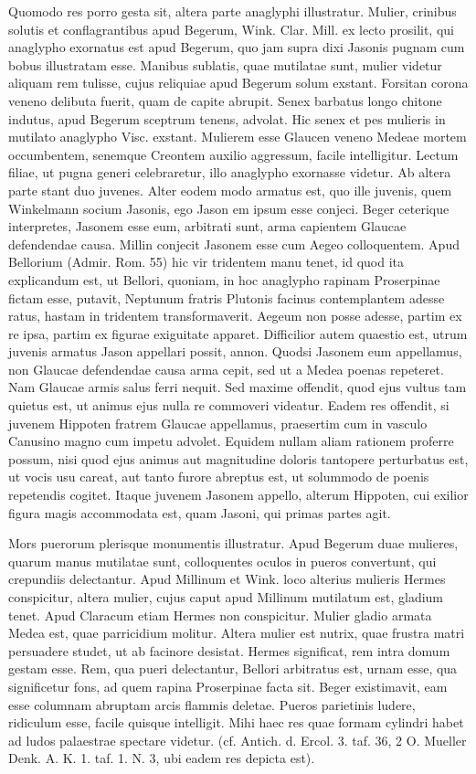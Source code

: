 \documentclass[a4paper, 11pt, oneside, polutonikogreek, german]{article}
\begin{document}
Quomodo res porro gesta sit, altera parte anaglyphi illustratur. Mulier, crinibus solutis et conflagrantibus apud Begerum, Wink. Clar. Mill. ex lecto prosilit, qui anaglypho exornatus est apud Begerum, quo jam supra dixi Jasonis pugnam cum bobus illustratam esse. Manibus sublatis, quae mutilatae sunt, mulier videtur aliquam rem tulisse, cujus reliquiae apud Begerum solum exstant. Forsitan corona veneno delibuta fuerit, quam de capite abrupit. Senex barbatus longo chitone indutus, apud Begerum sceptrum tenens, advolat. Hic senex et pes mulieris in mutilato anaglypho Visc. exstant. Mulierem esse Glaucen veneno Medeae mortem occumbentem, senemque Creontem auxilio aggressum, facile intelligitur. Lectum filiae, ut pugna generi celebraretur, illo anaglypho exornasse videtur. Ab altera parte stant duo juvenes. Alter eodem modo armatus est, quo ille juvenis, quem Winkelmann socium Jasonis, ego Jason em ipsum esse conjeci. Beger ceterique interpretes, Jasonem esse eum, arbitrati sunt, arma capientem Glaucae defendendae causa. Millin conjecit Jasonem esse cum Aegeo colloquentem. Apud Bellorium (Admir. Rom. 55) hic vir tridentem manu tenet, id quod ita explicandum est, ut Bellori, quoniam, in hoc anaglypho rapinam Proserpinae fictam esse, putavit, Neptunum fratris Plutonis facinus contemplantem adesse ratus, hastam in tridentem transformaverit. Aegeum non posse adesse, partim ex re ipsa, partim ex figurae exiguitate apparet. Difficilior autem quaestio est, utrum juvenis armatus Jason appellari possit, annon. Quodsi Jasonem eum appellamus, non Glaucae defendendae causa arma cepit, sed ut a Medea poenas repeteret. Nam Glaucae armis salus ferri nequit. Sed maxime offendit, quod ejus vultus tam quietus est, ut animus ejus nulla re commoveri videatur. Eadem res offendit, si juvenem Hippoten fratrem Glaucae appellamus, praesertim cum in vasculo Canusino magno cum impetu advolet. Equidem nullam aliam rationem proferre possum, nisi quod ejus animus aut magnitudine doloris tantopere perturbatus est, ut vocis usu careat, aut tanto furore abreptus est, ut solummodo de poenis repetendis cogitet. Itaque juvenem Jasonem appello, alterum Hippoten, cui exilior figura magis accommodata est, quam Jasoni, qui primas partes agit.

Mors puerorum plerisque monumentis illustratur. Apud Begerum duae mulieres, quarum manus mutilatae sunt, colloquentes oculos in pueros convertunt, qui crepundiis delectantur. Apud Millinum et Wink. loco alterius mulieris Hermes conspicitur, altera mulier, cujus caput apud Millinum mutilatum est, gladium tenet. Apud Claracum etiam Hermes non conspicitur. Mulier gladio armata Medea est, quae parricidium molitur. Altera mulier est nutrix, quae frustra matri persuadere studet, ut ab facinore desistat. Hermes significat, rem intra domum gestam esse. Rem, qua pueri delectantur, Bellori arbitratus est, urnam esse, qua significetur fons, ad quem rapina Proserpinae facta sit. Beger existimavit, eam esse columnam abruptam arcis flammis deletae. Pueros parietinis ludere, ridiculum esse, facile quisque intelligit. Mihi haec res quae formam cylindri habet ad ludos palaestrae spectare videtur. (cf. Antich. d. Ercol. 3. taf. 36, 2 O. Mueller Denk. A. K. 1. taf. 1. N. 3, ubi eadem res depicta est).
\end{document}
